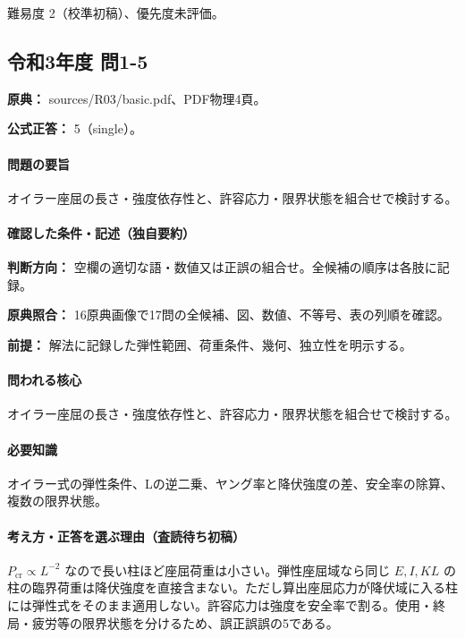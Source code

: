 \par 難易度 2（校準初稿）、優先度未評価。

\subsection{令和3年度 問1-5}
\label{q:r03-reg-basic-1-5}

\noindent\textbf{原典：} sources/R03/basic.pdf、PDF物理4頁。

\textbf{公式正答：} 5（single）。

\paragraph{問題の要旨} オイラー座屈の長さ・強度依存性と、許容応力・限界状態を組合せで検討する。

\paragraph{確認した条件・記述（独自要約）}\mbox{}\par

\noindent\textbf{判断方向：} 空欄の適切な語・数値又は正誤の組合せ。全候補の順序は各肢に記録。\par

\noindent\textbf{原典照合：} 16原典画像で17問の全候補、図、数値、不等号、表の列順を確認。\par

\noindent\textbf{前提：} 解法に記録した弾性範囲、荷重条件、幾何、独立性を明示する。\par

\paragraph{問われる核心} オイラー座屈の長さ・強度依存性と、許容応力・限界状態を組合せで検討する。

\paragraph{必要知識} オイラー式の弾性条件、Lの逆二乗、ヤング率と降伏強度の差、安全率の除算、複数の限界状態。

\paragraph{考え方・正答を選ぶ理由（査読待ち初稿）} \(P_{\mathrm{cr}}\propto L^{-2}\) なので長い柱ほど座屈荷重は小さい。弾性座屈域なら同じ \(E,I,KL\) の柱の臨界荷重は降伏強度を直接含まない。ただし算出座屈応力が降伏域に入る柱には弾性式をそのまま適用しない。許容応力は強度を安全率で割る。使用・終局・疲労等の限界状態を分けるため、誤正誤誤の5である。

